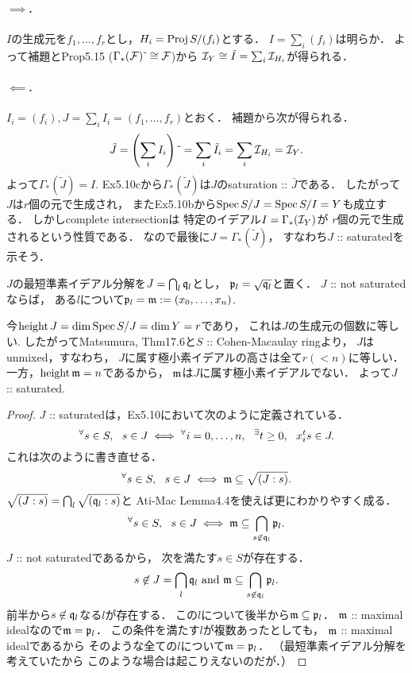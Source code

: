 \documentclass[a4paper]{jsarticle}
\begin{document}
    \paragraph{$\implies$.}
    $I$の生成元を$f_1,\dots,f_r$とし，$H_i=\operatorname{Proj} S/(f_i)$とする．
    $I=\sum_i (f_i)$は明らか．
    よって補題とProp5.15 ($\Gamma_*(\mathcal{F})\,\tilde{}\, \cong \mathcal{F}$)から
    $\mathcal{I}_Y \cong \tilde{I}=\sum_i \mathcal{I}_{H_i}$が得られる．

    \paragraph{$\impliedby$.}
    $I_i=(f_i), J=\sum_i I_i=(f_1,\dots,f_r)$とおく．
    補題から次が得られる．
    \[ \tilde{J}=\left( \sum_i I_i \right)\,\tilde{}\,=\sum_i \tilde{I}_i=\sum_i \mathcal{I}_{H_i}=\mathcal{I}_Y. \]
    よって$\Gamma_*(\tilde{J})=I$.
    Ex5.10cから$\Gamma_*(\tilde{J})$は$J$のsaturation :: $\bar{J}$である．
    したがって$J$は$r$個の元で生成され，
    またEx5.10bから$\operatorname{Spec} S/J=\operatorname{Spec} S/I=Y$も成立する．
    しかしcomplete intersectionは
    特定のイデアル$I=\Gamma_*(\mathcal{I}_Y)$が
    $r$個の元で生成されるという性質である．
    なので最後に$J=\Gamma_*(\tilde{J})$，
    すなわち$J$ :: saturatedを示そう．
    \begin{Claim}
        $J$の最短準素イデアル分解を$J=\bigcap_l \mathfrak{q}_l$とし，
        $\mathfrak{p}_l=\sqrt{\mathfrak{q}_l}$と置く．
        $J$ :: not saturatedならば，
        ある$l$について$\mathfrak{p}_l=\mathfrak{m}:=(x_0,\dots,x_n)$.
    \end{Claim}
    今$\operatorname{height} J=\dim \operatorname{Spec} S/J=\dim Y=r$であり，
    これは$J$の生成元の個数に等しい.
    したがってMatsumura, Thm17.6と$S$ :: Cohen-Macaulay ringより，
    $J$はunmixed，すなわち，
    $J$に属す極小素イデアルの高さは全て$r(<n)$に等しい．
    一方，$\operatorname{height} \mathfrak{m}=n$であるから，
    $\mathfrak{m}$は$J$に属す極小素イデアルでない．
    よって$J$ :: saturated.
    \begin{proof}
        $J$ :: saturatedは，Ex5.10において次のように定義されている．
        \[
            {}^{\forall} s \in S,~~
            s \in J
            \iff
            {}^{\forall} i=0,\dots,n,~~ {}^{\exists} t \geq 0,~~ x_i^t s \in J.
        \]
        これは次のように書き直せる．
        \[ {}^{\forall} s \in S,~~ s \in J \iff \mathfrak{m} \subseteq \sqrt{(J:s)}. \]
        $\sqrt{(J:s)}=\bigcap_l \sqrt{(\mathfrak{q}_l:s)}$と
        Ati-Mac Lemma4.4を使えば更にわかりやすく成る．
        \[ {}^{\forall} s \in S,~~ s \in J \iff \mathfrak{m} \subseteq \bigcap_{s \not \in \mathfrak{q}_l} \mathfrak{p}_l. \]
        $J$ :: not saturatedであるから，
        次を満たす$s \in S$が存在する．
        \[ s \not \in J=\bigcap_l \mathfrak{q}_l \text{ and } \mathfrak{m} \subseteq \bigcap_{s \not \in \mathfrak{q}_l} \mathfrak{p}_l. \]
        前半から$s \not \in \mathfrak{q}_l$なる$l$が存在する．
        この$l$について後半から$\mathfrak{m} \subseteq \mathfrak{p}_l$．
        $\mathfrak{m}$ :: maximal idealなので$\mathfrak{m}=\mathfrak{p}_l$．
        この条件を満たす$l$が複数あったとしても，
        $\mathfrak{m}$ :: maximal idealであるから
        そのような全ての$l$について$\mathfrak{m}=\mathfrak{p}_l$．
        （最短準素イデアル分解を考えていたから
        このような場合は起こりえないのだが．）
    \end{proof}
\end{document}
